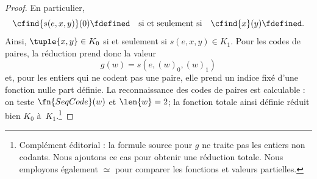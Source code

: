 \documentclass[../../../include/open-logic-section]{subfiles}
\begin{document}
\begin{proof}
En particulier,
\[
\cfind{s(e,x,y)}(0) \fdefined \quad \text{si et seulement si} \quad
\cfind{x}(y) \fdefined.
\]
Ainsi, $\tuple{x,y}\in K_0$ si et seulement si
$s(e,x,y)\in K_1$. Pour les codes de paires,
la réduction prend donc la valeur
\[
g(w) = s(e,(w)_0,(w)_1)
\]
et, pour les entiers qui ne codent pas une paire,
elle prend un indice fixé d'une fonction nulle
part définie. La reconnaissance des codes de
paires est calculable : on teste $\fn{SeqCode}(w)$ et $\len{w}=2$; la fonction totale ainsi
définie réduit bien $K_0$ à~$K_1$.\footnote{Complément éditorial : la formule source pour $g$ ne traite pas les entiers non codants. Nous ajoutons ce cas pour obtenir une réduction totale. Nous employons également $\simeq$ pour comparer les fonctions et valeurs partielles.}
\end{proof}
\end{document}
